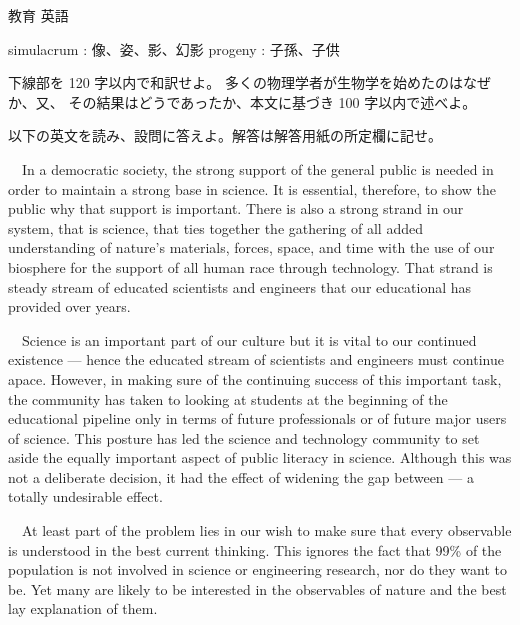 \documentclass[fleqn]{jbook}
\begin{document}
\begin{question}{教育 英語}{}
\begin{subquestions}
  simulacrum : 像、姿、影、幻影 \quad
  progeny : 子孫、子供\\
\baselineskip=15pt

  \noindent{[設問]}
  \begin{subsubquestions}
  \SubSubQuestion
    下線部を 120 字以内で和訳せよ。
  \SubSubQuestion
    多くの物理学者が生物学を始めたのはなぜか、又、
    その結果はどうであったか、本文に基づき 100 字以内で述べよ。
  \end{subsubquestions}




\SubQuestion
  以下の英文を読み、設問に答えよ。解答は解答用紙の所定欄に記せ。
\baselineskip=12pt

  　In a democratic society, the strong support of the general public
  is needed in order to maintain a strong base in science. It is
  essential, therefore, to show the public why that support is
  important.
  There is also a strong strand in our system, that is science, that
  ties together the gathering of all added understanding of nature's
  materials, forces, space, and time with the use of our biosphere
  for the support of all human race through technology. That strand
  is steady stream of educated scientists and engineers that our
  educational has provided over years.

  　Science is an important part of our culture but it is vital to
  our continued existence --- hence the educated stream of scientists and
  engineers must continue apace. However, in making sure of the
  continuing success of this important task, the community has taken
  to looking at students at the beginning of the educational pipeline
  only in terms of future professionals or of future major users of
  science. This posture has led the science and technology community
  to set aside the equally important aspect of public literacy in
  science. Although this was not a deliberate decision, it had the
  effect of widening the gap between
   --- a totally undesirable effect.

  　At least part of the problem lies in our wish to make sure that
  every observable is understood in the best current thinking. This
  ignores the fact that 99\% of the population is not involved in
  science or engineering research, nor do they want to be. Yet many
  are likely to be interested in the observables of nature and the
  best lay explanation of them.


\end{subquestions}
\end{question}
\end{document}
